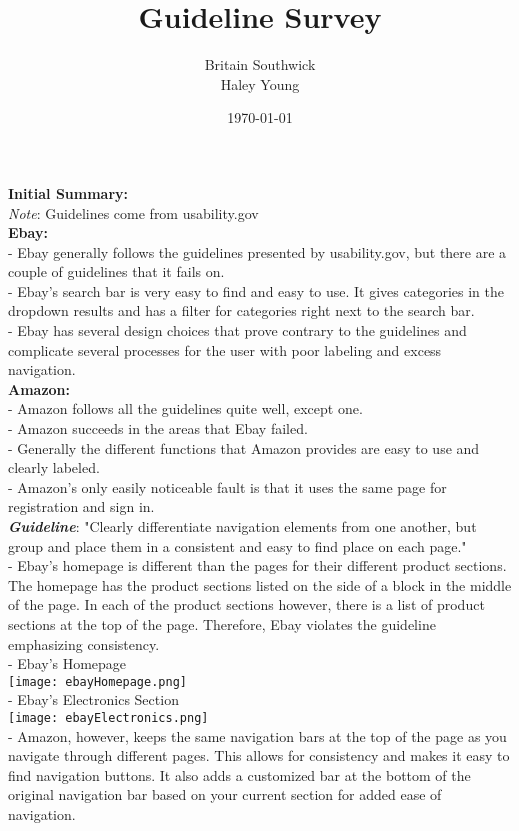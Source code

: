 \documentclass{article}
\title{Guideline Survey}
\author{Britain Southwick\\Haley Young}
\date{\today}
\begin{document}
\maketitle

\textbf{Initial Summary:}\\ 
\emph{Note}: Guidelines come from usability.gov\\
\textbf{Ebay:}\\
- Ebay generally follows the guidelines presented by usability.gov, but there are a couple of guidelines that it fails on.\\
  - Ebay's search bar is very easy to find and easy to use. It gives categories in the dropdown results and has a filter for categories right next to the search bar.\\
  - Ebay has several design choices that prove contrary to the guidelines and complicate several processes for the user with poor labeling and excess navigation.\\
\textbf{Amazon:}\\
- Amazon follows all the guidelines quite well, except one.\\
  - Amazon succeeds in the areas that Ebay failed.\\
  - Generally the different functions that Amazon provides are easy to use and clearly labeled.\\
  - Amazon's only easily noticeable fault is that it uses the same page for registration and sign in.\\
\newline
\textbf{\emph{Guideline}}: "Clearly differentiate navigation elements from one another, but group and place them in a consistent and easy to find place on each page."\\
- Ebay's homepage is different than the pages for their different product sections. The homepage has the product sections listed on the side of a block in the middle of the page. In each of the product sections however, there is a list of product sections at the top of the page. Therefore, Ebay violates the guideline emphasizing consistency.\\
  - Ebay's Homepage\\
\texttt{[image: ebayHomepage.png]}\\
  - Ebay's Electronics Section\\
\texttt{[image: ebayElectronics.png]}\\

 

- Amazon, however, keeps the same navigation bars at the top of the page as you navigate through different pages. This allows for consistency and makes it easy to find navigation buttons. It also adds a customized bar at the bottom of the original navigation bar based on your current section for added ease of navigation.\\
\end{document}
